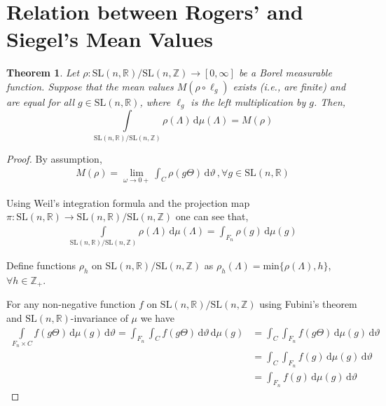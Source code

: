\documentclass[11pt]{article}
\newtheorem{theorem}{Theorem}[section]
\theoremstyle{definition}
\theoremstyle{proof}
\begin{document}
\section{Relation between Rogers' and Siegel's Mean Values}
\begin{theorem}\label{rmveqsmv}
    Let $\rho : \mathrm{SL}(n,\mathbb{R})/\mathrm{SL}(n,\mathbb{Z}) \to [0, \infty]$ be a Borel measurable function.
    Suppose that the mean values $M(\rho \circ \ell_g)$ exists (i.e., are finite) and are equal for all $g \in \mathrm{SL}(n,\mathbb{R})$, where $\ell_g$ is the left multiplication by $g$.
    Then,
    \[
        \int\limits_{\mathrm{SL}(n,\mathbb{R})/\mathrm{SL}(n,\mathbb{Z})} \rho (\Lambda )\, \mathrm{d} \mu (\Lambda ) = M(\rho )
    \]
\end{theorem}
\begin{proof}
    By assumption,
    \begin{align}\label{eqassumption}
        M(\rho )  = \lim_{\omega \to 0+}\int_{C}\rho (g \Theta ) \, \mathrm{d} \vartheta \, , \forall g \in \mathrm{SL}(n,\mathbb{R})
    \end{align}

    Using Weil's integration formula and the projection map $\pi : \mathrm{SL}(n,\mathbb{R}) \to \mathrm{SL}(n,\mathbb{R})/\mathrm{SL}(n,\mathbb{Z})$ one can see that,
    \begin{align}\label{intrho}
        \int\limits_{\mathrm{SL}(n,\mathbb{R})/\mathrm{SL}(n,\mathbb{Z})} \rho (\Lambda ) \, \mathrm{d} \mu (\Lambda ) = \int_{F_n} \rho (g) \, \mathrm{d} \mu (g)
    \end{align}

    Define functions $\rho _h$ on $\mathrm{SL}(n,\mathbb{R})/\mathrm{SL}(n,\mathbb{Z})$ as $\rho _h(\Lambda ) = \text{min} \{\rho (\Lambda ), h\}$, $\forall h \in \mathbb{Z}_+$.

    For any non-negative function $f$ on $\mathrm{SL}(n,\mathbb{R})/\mathrm{SL}(n,\mathbb{Z})$ using Fubini's theorem and $\mathrm{SL}(n,\mathbb{R})$-invariance of $\mu$ we have
    \begin{align*}
        \int\limits_{F_n \times C} f (g \Theta ) \, \mathrm{d} \mu (g) \, \mathrm{d} \vartheta = \int_{F_n}\int_{C} f(g \Theta ) \, \mathrm{d} \vartheta \, \mathrm{d} \mu (g) &= \int_{C} \int_{F_n}f (g \Theta ) \, \mathrm{d} \mu (g) \, \mathrm{d} \vartheta \\
        &= \int_{C} \int_{F_n} f(g) \, \mathrm{d} \mu (g) \, \mathrm{d} \vartheta \\
        &= \int_{F_n} f(g) \, \mathrm{d} \mu (g) \, \mathrm{d} \vartheta 
    \end{align*}


\end{proof}
\end{document}
